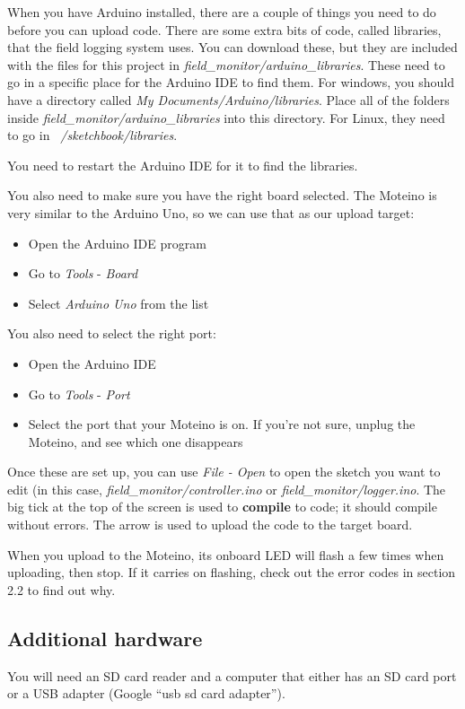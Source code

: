 \documentclass[10pt]{article}
\begin{document}
When you have Arduino installed, there are a couple of things you need to do before you can upload code. There are some extra bits of code, called libraries, that the
field logging system uses. You can download these, but they are included with the files for this project in \textit{field\_monitor/arduino\_libraries}. These need to
go in a specific place for the Arduino IDE to find them. For windows, you should have a directory called \textit{My Documents/Arduino/libraries}. Place all of the folders
inside \textit{field\_monitor/arduino\_libraries} into this directory. For Linux, they need to go in \textit{~/sketchbook/libraries}. 

You need to restart the Arduino IDE for it to find the libraries.

You also need to make sure you have the right board selected. The Moteino is very similar to the Arduino Uno, so we can use that as our upload target:

\begin{itemize}
 \item Open the Arduino IDE program
 \item Go to \textit{Tools} - \textit{Board}
 \item Select \textit{Arduino Uno} from the list
\end{itemize}

You also need to select the right port:

\begin{itemize}
 \item Open the Arduino IDE 
 \item Go to \textit{Tools} - \textit{Port}
 \item Select the port that your Moteino is on. If you're not sure, unplug the Moteino, and see which one disappears
\end{itemize}

Once these are set up, you can use \textit{File - Open} to open the sketch you want to edit (in this case, \textit{field\_monitor/controller.ino} or \textit{field\_monitor/logger.ino}. The big tick at the top of the screen is used to \textbf{compile} to code; it should compile without errors. The arrow is used to upload the code to the target board.

When you upload to the Moteino, its onboard LED will flash a few times when uploading, then stop. If it carries on flashing, check out the error codes in section 2.2 to find out why.

\subsection{Additional hardware}
You will need an SD card reader and a computer that either has an SD card port or a USB adapter (Google ``usb sd card adapter'').
\end{document}
